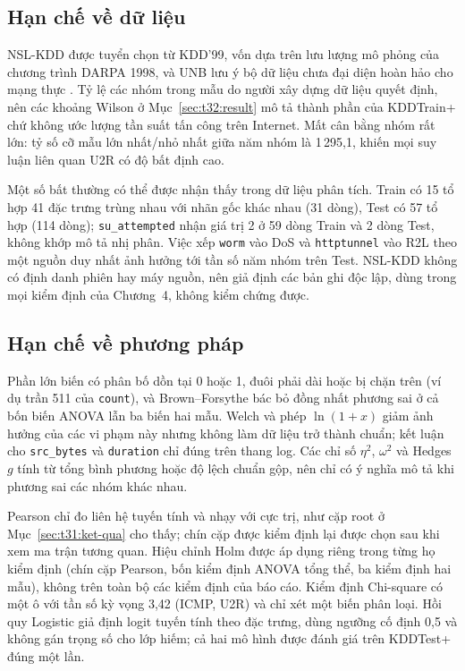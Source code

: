\documentclass[../main.tex]{subfiles}
\begin{document}
\subsection{Hạn chế về dữ liệu}
NSL-KDD được tuyển chọn từ KDD'99, vốn dựa trên lưu lượng mô phỏng của chương trình DARPA 1998, và UNB lưu ý bộ dữ liệu chưa đại diện hoàn hảo cho mạng thực \cite{task2_unb2009}. Tỷ lệ các nhóm trong mẫu do người xây dựng dữ liệu quyết định, nên các khoảng Wilson ở Mục~\ref{sec:t32:result} mô tả thành phần của KDDTrain+ chứ không ước lượng tần suất tấn công trên Internet. Mất cân bằng nhóm rất lớn: tỷ số cỡ mẫu lớn nhất/nhỏ nhất giữa năm nhóm là 1\,295,1, khiến mọi suy luận liên quan U2R có độ bất định cao.

Một số bất thường có thể được nhận thấy trong dữ liệu phân tích. Train có 15 tổ hợp 41 đặc trưng trùng nhau với nhãn gốc khác nhau (31 dòng), Test có 57 tổ hợp (114 dòng); \texttt{su\_attempted} nhận giá trị 2 ở 59 dòng Train và 2 dòng Test, không khớp mô tả nhị phân. Việc xếp \texttt{worm} vào DoS và \texttt{httptunnel} vào R2L theo một nguồn duy nhất ảnh hưởng tới tần số năm nhóm trên Test. NSL-KDD không có định danh phiên hay máy nguồn, nên giả định các bản ghi độc lập, dùng trong mọi kiểm định của Chương~4, không kiểm chứng được.

\subsection{Hạn chế về phương pháp}
Phần lớn biến có phân bố dồn tại 0 hoặc 1, đuôi phải dài hoặc bị chặn trên (ví dụ trần 511 của \texttt{count}), và Brown--Forsythe bác bỏ đồng nhất phương sai ở cả bốn biến ANOVA lẫn ba biến hai mẫu. Welch và phép $\ln(1+x)$ giảm ảnh hưởng của các vi phạm này nhưng không làm dữ liệu trở thành chuẩn; kết luận cho \texttt{src\_bytes} và \texttt{duration} chỉ đúng trên thang log. Các chỉ số $\eta^2$, $\omega^2$ và Hedges $g$ tính từ tổng bình phương hoặc độ lệch chuẩn gộp, nên chỉ có ý nghĩa mô tả khi phương sai các nhóm khác nhau.

Pearson chỉ đo liên hệ tuyến tính và nhạy với cực trị, như cặp root ở Mục~\ref{sec:t31:ket-qua} cho thấy; chín cặp được kiểm định lại được chọn sau khi xem ma trận tương quan. Hiệu chỉnh Holm được áp dụng riêng trong từng họ kiểm định (chín cặp Pearson, bốn kiểm định ANOVA tổng thể, ba kiểm định hai mẫu), không trên toàn bộ các kiểm định của báo cáo. Kiểm định Chi-square có một ô với tần số kỳ vọng 3,42 (ICMP, U2R) và chỉ xét một biến phân loại. Hồi quy Logistic giả định logit tuyến tính theo đặc trưng, dùng ngưỡng cố định 0,5 và không gán trọng số cho lớp hiếm; cả hai mô hình được đánh giá trên KDDTest+ đúng một lần.
\end{document}
